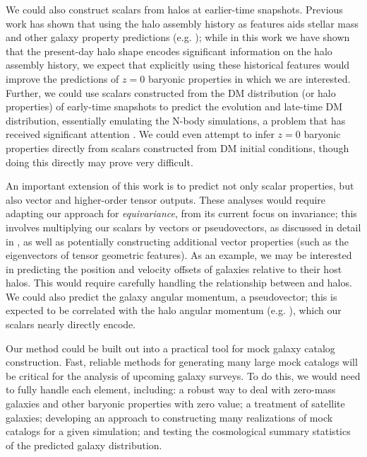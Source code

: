 We could also construct scalars from halos at earlier-time snapshots.
Previous work has shown that using the halo assembly history as features aids stellar mass and other galaxy property predictions (e.g. \citealt{jespersen_learning_2022}); while in this work we have shown that the present-day halo shape encodes significant information on the halo assembly history, we expect that explicitly using these historical features would improve the predictions of $z=0$ baryonic properties in which we are interested.
Further, we could use scalars constructed from the DM distribution (or halo properties) of early-time snapshots to predict the evolution and late-time DM distribution, essentially emulating the N-body simulations, a problem that has received significant attention \citep{he_learning_2018, jamieson_field_2022}.
We could even attempt to infer $z=0$ baryonic properties directly from scalars constructed from DM initial conditions, though doing this directly may prove very difficult.

An important extension of this work is to predict not only scalar properties, but also vector and higher-order tensor outputs.
These analyses would require adapting our approach for \emph{equivariance}, from its current focus on invariance; this involves multiplying our scalars by vectors or pseudovectors, as discussed in detail in \cite{Villar2021a}, as well as potentially constructing additional vector properties (such as the eigenvectors of tensor geometric features).
As an example, we may be interested in predicting the position and velocity offsets of galaxies relative to their host halos.
This would require carefully handling the relationship between \dark and \hydro halos.
We could also predict the galaxy angular momentum, a pseudovector; this is expected to be correlated with the halo angular momentum (e.g. \citealt{jiang_is_2019}), which our scalars nearly directly encode.

Our method could be built out into a practical tool for mock galaxy catalog construction.
Fast, reliable methods for generating many large mock catalogs will be critical for the analysis of upcoming galaxy surveys.
To do this, we would need to fully handle each element, including: a robust way to deal with zero-mass galaxies and other baryonic properties with zero value; a treatment of satellite galaxies; developing an approach to constructing many realizations of mock catalogs for a given simulation; and testing the cosmological summary statistics of the predicted galaxy distribution.

